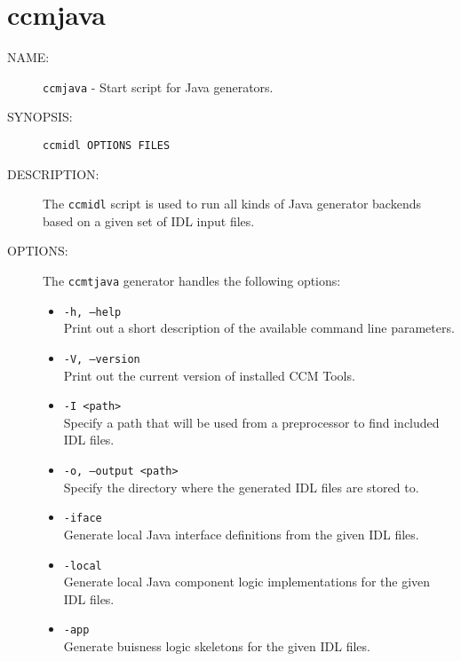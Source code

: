 \section{ccmjava}
\begin{description}
\item [NAME:] 
  {\tt ccmjava} - Start script for Java generators.

\item [SYNOPSIS:] 
  {\tt ccmidl OPTIONS FILES}

\item [DESCRIPTION:]
The {\tt ccmidl} script is used to run all kinds of Java generator backends based
on a given set of IDL input files. 

\item [OPTIONS:]
  The {\tt ccmtjava} generator handles the following options:
  \begin{itemize}
  \item {\tt -h, --help} \\
    Print out a short description of the available command line parameters.

  \item {\tt -V, --version} \\
    Print out the current version of installed CCM Tools.

  \item {\tt -I <path>} \\
    Specify a path that will be used from a preprocessor to find 
    included IDL files.
  
  \item {\tt -o, --output <path> } \\
    Specify the directory where the generated IDL files are stored to.

  \item {\tt -iface } \\
	Generate local Java interface definitions from the given IDL files. 

  \item {\tt -local } \\
	Generate local Java component logic implementations for the given IDL files.  

  \item {\tt -app } \\
	Generate buisness logic skeletons for the given IDL files.


\end{itemize}
\end{description}
